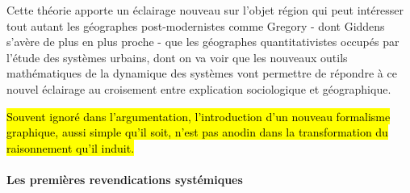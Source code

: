 
Cette théorie apporte un éclairage nouveau sur l'objet région qui peut intéresser tout autant les géographes post-modernistes comme Gregory - dont Giddens s'avère de plus en plus proche - que les géographes quantitativistes occupés par l'étude des systèmes urbains, dont on va voir que les nouveaux outils mathématiques de la dynamique des systèmes vont permettre de répondre à ce nouvel éclairage au croisement entre explication sociologique et géographique.



\hl{Souvent ignoré dans l'argumentation, l'introduction d'un nouveau formalisme graphique, aussi simple qu'il soit, n'est pas anodin dans la transformation du raisonnement qu'il induit.}


\paragraph{Les premières revendications systémiques}

